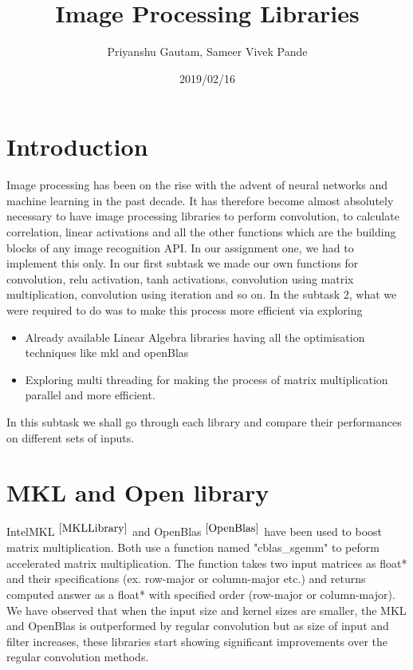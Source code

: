 \documentclass[a4paper]{article}
\title{Image Processing Libraries}
\author{Priyanshu Gautam, Sameer Vivek Pande}
\date{2019/02/16}
\begin{document}
\maketitle

\section{Introduction}

Image processing has been on the rise with the advent of neural networks and machine learning in the past decade. It has therefore become almost absolutely necessary to have image processing libraries to perform convolution, to calculate correlation, linear activations and all the other functions which are the building blocks of any image recognition API.
In our assignment one, we had to implement this only. In our first subtask we made our own functions for convolution, relu activation, tanh activations, convolution using matrix multiplication, convolution using iteration and so on. In the subtask 2, what we were required to do was to make this process more efficient via exploring \begin{itemize}
\item Already available Linear Algebra libraries having all the optimisation techniques like mkl and openBlas
\item Exploring multi threading for making the process of matrix multiplication parallel and more efficient.
\end {itemize}

In this subtask we shall go through each library and compare their performances on different sets of inputs.



\section{MKL and Open library}
IntelMKL $^{ \cite{MKLLibrary}}$ and OpenBlas $^{\cite{OpenBlas}}$ have been used to boost matrix multiplication. Both use a function named "cblas\_sgemm" to peform accelerated matrix multiplication. The function takes two input matrices as float* and their specifications (ex. row-major or column-major etc.) and returns computed answer as a float* with specified order (row-major or column-major).
We have observed that when the input size and kernel sizes are smaller, the MKL and OpenBlas is outperformed by regular convolution but as size of input and filter increases, these libraries start showing significant improvements over the regular convolution methods. 
\end{document}
